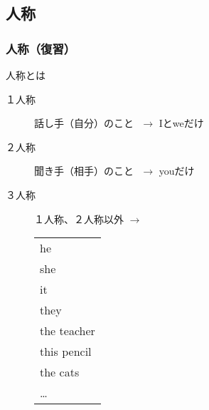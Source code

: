 \documentclass[aspectratio=169,xcolor={dvipsnames,table}]{beamer}
\begin{document}
\subsection{人称}
\begin{frame}[plain,label=ninsyo]\frametitle{人称（復習）}

\begin{block}{人称とは}
\begin{description}
\item[１人称] 話し手（自分）のこと\pause{}\,\,{} $\longrightarrow$ Iとweだけ\pause
\item[２人称] 聞き手（相手）のこと\pause{}\,\,{} $\longrightarrow$ youだけ\pause
\item[３人称] １人称、２人称以外\pause{}\hspace{15pt} $\longrightarrow$%
 \begin{tabular}[t]{@{\,\,}l}
he\\\pause
she\\\pause
it\\\pause
they\\\pause
the teacher\\\pause
this pencil\\\pause
the cats\\\pause
\ldots
 \end{tabular}
\end{description}
\end{block}
\end{frame}
\end{document}
